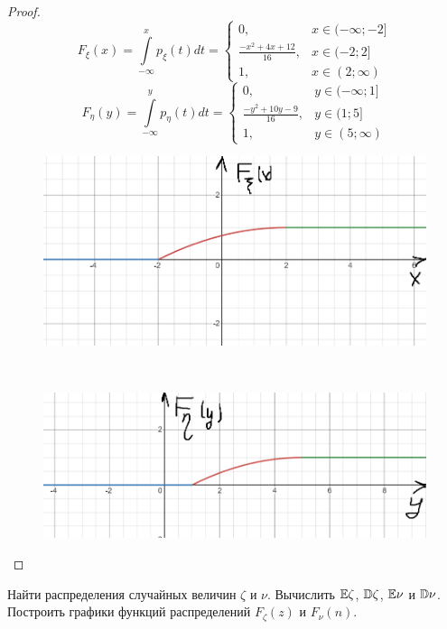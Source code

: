 \begin{proof}
\[
F_{\xi}(x) = \int\limits_{-\infty}^{x}p_{\xi}(t)dt = \begin{cases}
    0, & x\in (-\infty;-2]\\
    \frac{-x^2 + 4x + 12}{16}, & x\in (-2; 2]\\
    1, & x\in (2;\infty)
\end{cases}
\]
\[
F_{\eta}(y) = \int\limits_{-\infty}^{y}p_{\eta}(t)dt = \begin{cases}
    0, & y\in (-\infty;1]\\
    \frac{-y^2 + 10y - 9}{16}, & y\in (1; 5]\\
    1, & y\in (5;\infty)
\end{cases}
\]

\begin{figure}[H]
    \centering
    \includegraphics[width=0.5\linewidth]{3idz_1png.png}
    \caption{}
    \label{fig:enter-label}
\end{figure}
\\

\begin{figure}[H]
    \centering
    \includegraphics[width=0.5\linewidth]{3idz_2png.png}
    \caption{}
    \label{fig:enter-label}
\end{figure}
\end{proof}

\begin{problem}
Найти распределения случайных величин $\zeta$ и $\nu$. Вычислить $\mathbb E\zeta$, $\mathbb D\zeta$, $\mathbb E\nu$ и $\mathbb D\nu$. Построить графики функций распределений $F_{\zeta}(z)$ и $F_{\nu}(n)$.
\end{problem}

